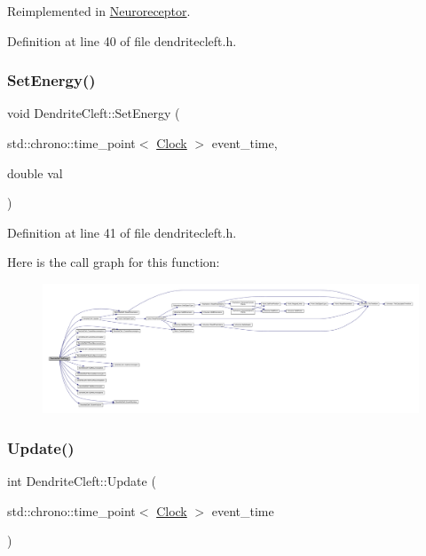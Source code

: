 Reimplemented in \hyperlink{class_neuroreceptor_a0660a316ef44cf723509f720acd16f24}{Neuroreceptor}.



Definition at line 40 of file dendritecleft.\+h.

\mbox{\label{class_dendrite_cleft_a7e09ccb70936deabde9c12457cec949c}} 
\subsubsection{\texorpdfstring{Set\+Energy()}{SetEnergy()}}
{\footnotesize\ttfamily void Dendrite\+Cleft\+::\+Set\+Energy (\begin{DoxyParamCaption}\item[{std\+::chrono\+::time\+\_\+point$<$ \hyperlink{universe_8h_a0ef8d951d1ca5ab3cfaf7ab4c7a6fd80}{Clock} $>$}]{event\+\_\+time,  }\item[{double}]{val }\end{DoxyParamCaption})\hspace{0.3cm}{\ttfamily [inline]}}



Definition at line 41 of file dendritecleft.\+h.

Here is the call graph for this function\+:
\nopagebreak
\begin{figure}[H]
\begin{center}
\leavevmode
\includegraphics[width=350pt]{class_dendrite_cleft_a7e09ccb70936deabde9c12457cec949c_cgraph}
\end{center}
\end{figure}
\mbox{\label{class_dendrite_cleft_a3a75af4d6fd97c9635134509f170a04e}} 
\subsubsection{\texorpdfstring{Update()}{Update()}}
{\footnotesize\ttfamily int Dendrite\+Cleft\+::\+Update (\begin{DoxyParamCaption}\item[{std\+::chrono\+::time\+\_\+point$<$ \hyperlink{universe_8h_a0ef8d951d1ca5ab3cfaf7ab4c7a6fd80}{Clock} $>$}]{event\+\_\+time }\end{DoxyParamCaption})}




